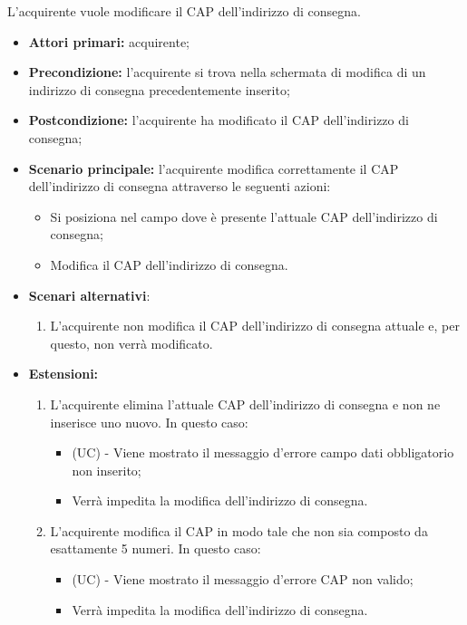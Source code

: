 L'acquirente vuole modificare il CAP dell'indirizzo di consegna.
\begin{itemize}
    \item \textbf{Attori primari:} acquirente;
    \item \textbf{Precondizione:} l'acquirente si trova nella schermata di modifica di un indirizzo di consegna precedentemente inserito;
    \item \textbf{Postcondizione:} l'acquirente ha modificato il CAP dell'indirizzo di consegna;
    \item \textbf{Scenario principale:} l'acquirente modifica correttamente il CAP dell'indirizzo di consegna attraverso le seguenti azioni:
    \begin{itemize}
        \item Si posiziona nel campo dove è presente l'attuale CAP dell'indirizzo di consegna;
        \item Modifica il CAP dell'indirizzo di consegna.
    \end{itemize}
    \item \textbf{Scenari alternativi}:
    \begin{enumerate}[label=\lett]
        \item L'acquirente non modifica il CAP dell'indirizzo di consegna attuale e, per questo, non verrà modificato.
    \end{enumerate}
    \item \textbf{Estensioni:}
    \begin{enumerate}[label=\lett]
        \item L'acquirente elimina l'attuale CAP dell'indirizzo di consegna e non ne inserisce uno nuovo. In questo caso:
        \begin{itemize}
            \item (UC) - Viene mostrato il messaggio d'errore campo dati obbligatorio non inserito;
            \item Verrà impedita la modifica dell'indirizzo di consegna.
        \end{itemize}
        \item L'acquirente modifica il CAP in modo tale che non sia composto da esattamente 5 numeri. In questo caso:
        \begin{itemize}
            \item (UC) - Viene mostrato il messaggio d'errore CAP non valido;
            \item Verrà impedita la modifica dell'indirizzo di consegna.
        \end{itemize}
    \end{enumerate}
\end{itemize}

